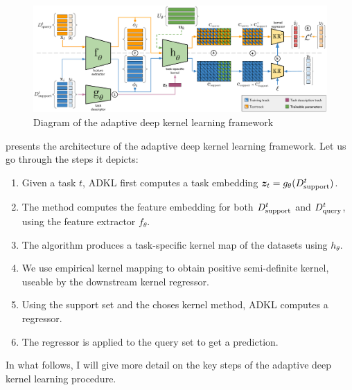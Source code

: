 \documentclass[11pt]{article}
\numberwithin{equation}{subsection}
\begin{document}

\begin{figure}[ht]
  \includegraphics[width=1.35\textwidth,center]{adkl/adkl}
  \caption{Diagram of the adaptive deep kernel learning framework}
  \label{fig:adkl}
\end{figure}

 presents the architecture of the adaptive deep kernel learning framework. Let us go through the steps it depicts:
\begin{enumerate}[noitemsep]
  \item Given a task $t$, ADKL first computes a task embedding ${\bm{z}}_t = g_\theta({D_{\mathrm{support}}^t})$.
  \item The method computes the feature embedding for both ${D_{\mathrm{support}}^t}$ and ${D_{\mathrm{query}}^t}$, using the feature extractor $f_\theta$.
  \item The algorithm produces a task-specific kernel map of the datasets using $h_\theta$.
  \item We use empirical kernel mapping to obtain positive semi-definite kernel, useable by the downstream kernel regressor.
  \item Using the support set and the choses kernel method, ADKL computes a regressor.
  \item The regressor is applied to the query set to get a prediction.
\end{enumerate}

In what follows, I will give more detail on the key steps of the adaptive deep kernel learning procedure.
\end{document}
